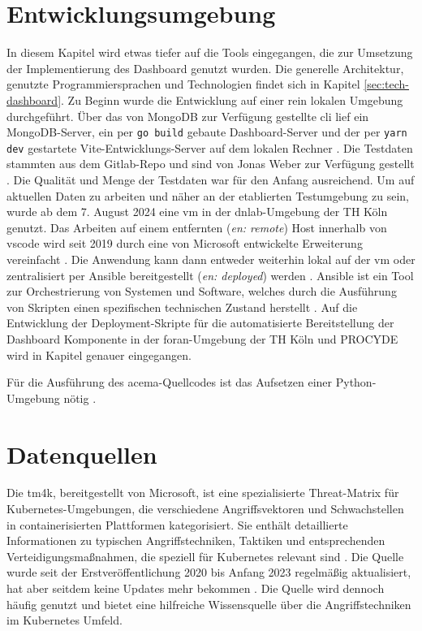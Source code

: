 \section{Entwicklungsumgebung}
\label{sec:Entwicklungsumgebung}
In diesem Kapitel wird etwas tiefer auf die Tools eingegangen, die zur Umsetzung der Implementierung des Dashboard genutzt wurden. Die generelle Architektur, genutzte Programmiersprachen und Technologien findet sich in Kapitel \ref{sec:tech-dashboard}. Zu Beginn wurde die Entwicklung auf einer rein lokalen Umgebung durchgeführt. Über das von MongoDB zur Verfügung gestellte \gls{cli} lief ein MongoDB-Server, ein per \verb|go build| gebaute Dashboard-Server und der per \verb|yarn dev| gestartete Vite-Entwicklungs-Server auf dem lokalen Rechner \autocite{MongoDBDeveloperData} \autocite{Vite}. Die Testdaten stammten aus dem Gitlab-Repo und sind von Jonas Weber zur Verfügung gestellt \autocite{AddExampleData2023}. Die Qualität und Menge der Testdaten war für den Anfang ausreichend. Um auf aktuellen Daten zu arbeiten und näher an der etablierten Testumgebung zu sein, wurde ab dem 7. August 2024 eine \gls{vm} in der \glqq\gls{dnlab}\grqq-Umgebung der TH Köln genutzt. Das Arbeiten auf einem entfernten (\textit{en: remote}) Host innerhalb von \gls{vscode} wird seit 2019 durch eine von Microsoft entwickelte Erweiterung vereinfacht \autocite{RemoteSSHVisual}. Die Anwendung kann dann entweder weiterhin lokal auf der \gls{vm} oder zentralisiert per Ansible bereitgestellt (\textit{en: deployed}) werden \autocite{HomepageAnsibleCollaborative}. Ansible ist ein Tool zur Orchestrierung von Systemen und Software, welches durch die Ausführung von Skripten einen spezifischen technischen Zustand herstellt \autocite{alHowAnsibleWorks2024}. Auf die Entwicklung der Deployment-Skripte für die automatisierte Bereitstellung der Dashboard Komponente in der \gls{foran}-Umgebung der TH Köln und PROCYDE wird in Kapitel  genauer eingegangen.
\par Für die Ausführung des \gls{acema}-Quellcodes ist das Aufsetzen einer Python-Umgebung nötig \autocite{FklementAcema_oranCode} \autocite{WelcomePythonorg}.

\section{Datenquellen}
\label{sec:datenquellen}
\par Die \gls{tm4k}, bereitgestellt von Microsoft, ist eine spezialisierte Threat-Matrix für Kubernetes-Umgebungen, die verschiedene Angriffsvektoren und Schwachstellen in containerisierten Plattformen kategorisiert. Sie enthält detaillierte Informationen zu typischen Angriffstechniken, Taktiken und entsprechenden Verteidigungsmaßnahmen, die speziell für Kubernetes relevant sind \autocite{TacticsThreatMatrix}. Die Quelle wurde seit der Erstveröffentlichung 2020 bis Anfang 2023 regelmäßig aktualisiert, hat aber seitdem keine Updates mehr bekommen \autocite{DeploymentsMicrosoftThreatMatrixforKubernetes}. Die Quelle wird dennoch häufig genutzt und bietet eine hilfreiche Wissensquelle über die Angriffstechniken im Kubernetes Umfeld.

